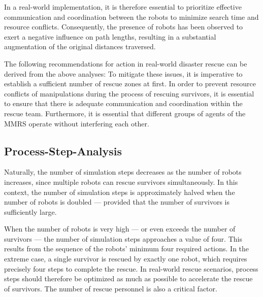 \documentclass[3p,times,procedia]{elsarticle}
\begin{document}
In a real-world implementation, it is therefore essential to prioritize effective communication and coordination between the robots to minimize search time and resource conflicts.
Consequently, the presence of robots has been observed to exert a negative influence on path lengths, resulting in a substantial augmentation of the original distances traversed. 

The following recommendations for action in real-world disaster rescue can be derived from the above analyses:
To mitigate these issues, it is imperative to establish a sufficient number of rescue zones at first.
In order to prevent resource conflicts of manipulations during the process of rescuing survivors, it is essential to ensure that there is adequate communication and coordination within the rescue team.
Furthermore, it is essential that different groups of agents of the MMRS operate without interfering each other.

\subsection{Process-Step-Analysis}
\label{subsec:process_step_analysis}

Naturally, the number of simulation steps decreases as the number of robots increases, since multiple robots can rescue survivors simultaneously.
In this context, the number of simulation steps is approximately halved when the number of robots is doubled — provided that the number of survivors is sufficiently large. 


When the number of robots is very high — or even exceeds the number of survivors — the number of simulation steps approaches a value of four. 
This results from the sequence of the robots’ minimum four required actions. 
In the extreme case, a single survivor is rescued by exactly one robot, which requires precisely four steps to complete the rescue.
In real-world rescue scenarios, process steps should therefore be optimized as much as possible to accelerate the rescue of survivors. 
The number of rescue personnel is also a critical factor.
\end{document}
